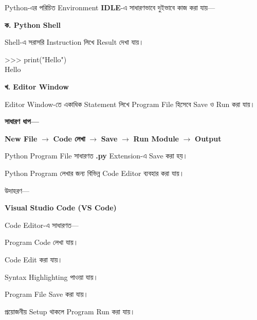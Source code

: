 

Python-এর পরিচিত Environment
\textbf{IDLE}-এ সাধারণভাবে দুইভাবে কাজ করা যায়—

\textbf{ক. Python Shell}

Shell-এ সরাসরি Instruction লিখে Result দেখা যায়।

\begin{codebox}

\begin{english}
\ttfamily
>>> print("Hello")\\
Hello
\end{english}

\end{codebox}

\textbf{খ. Editor Window}

Editor Window-তে একাধিক Statement লিখে Program File হিসেবে
Save ও Run করা যায়।

\textbf{সাধারণ ধাপ—}

\begin{center}

\textbf{New File}
\(\longrightarrow\)
\textbf{Code লেখা}
\(\longrightarrow\)
\textbf{Save}
\(\longrightarrow\)
\textbf{Run Module}
\(\longrightarrow\)
\textbf{Output}

\end{center}

Python Program File সাধারণত
\textbf{\textenglish{\ttfamily .py}}
Extension-এ Save করা হয়।



Python Program লেখার জন্য বিভিন্ন Code Editor ব্যবহার করা যায়।

উদাহরণ—

\begin{center}

\textbf{Visual Studio Code (VS Code)}

\end{center}

Code Editor-এ সাধারণত—

\begin{compacttwocolpoints}

\item Program Code লেখা যায়।

\item Code Edit করা যায়।

\item Syntax Highlighting পাওয়া যায়।

\item Program File Save করা যায়।

\item প্রয়োজনীয় Setup থাকলে Program Run করা যায়।

\end{compacttwocolpoints}

